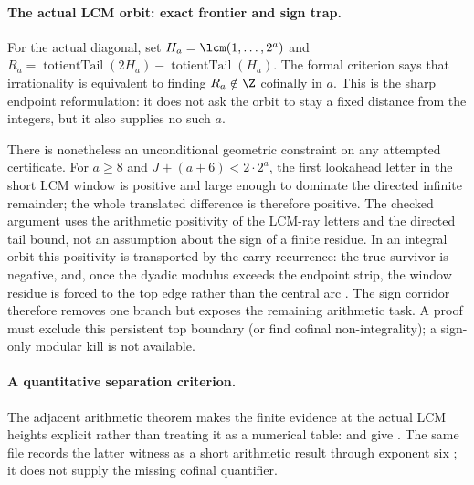 \paragraph{The actual LCM orbit: exact frontier and sign trap.}
For the actual diagonal, set $H_a=\lcm(1,\ldots,2^a)$ and
$R_a=\operatorname{totientTail}(2H_a)-\operatorname{totientTail}(H_a)$.
The formal criterion
says that irrationality is equivalent to finding $R_a\notin\Z$ cofinally in
$a$.  This is the sharp endpoint reformulation: it does not ask the orbit to
stay a fixed distance from the integers, but it also supplies no such $a$.

There is nonetheless an unconditional geometric constraint on any attempted
certificate.  For $a\ge8$ and
$J+(a+6)<2\cdot2^a$, the first lookahead letter in the short LCM window is
positive and large enough to dominate the directed infinite remainder; the
whole translated difference is therefore positive.  The checked argument
uses the arithmetic positivity of the LCM-ray letters and the directed tail
bound, not an assumption about the sign of a finite residue.  In an integral
orbit this positivity is transported by the carry recurrence: the true
survivor is negative, and, once the dyadic modulus exceeds the endpoint strip,
the window residue is forced to the top edge rather than the central arc
.
The sign corridor therefore removes one branch but exposes the remaining
arithmetic task.  A proof must exclude this persistent top boundary (or find
cofinal non-integrality); a sign-only modular kill is not available.

\paragraph{A quantitative separation criterion.}
The adjacent arithmetic theorem makes the finite evidence at the actual
LCM heights explicit rather than treating it as a numerical table:
and
give
.
The same file records the latter witness as a short arithmetic result
through exponent six
; it does not supply the missing cofinal quantifier.


